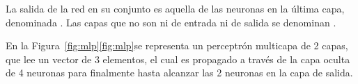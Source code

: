 
La salida de la red en su conjunto es aquella de las neuronas en la
última capa, denominada . Las capas que no son ni de
entrada ni de salida se denominan .

En la \iflatexml{}Figura~\ref{fig:mlp}\else\autoref{fig:mlp}\fi se
representa un perceptrón multicapa de 2 capas, que lee un vector de 3
elementos, el cual es propagado a través de la capa oculta de 4
neuronas para finalmente hasta alcanzar las 2 neuronas en la capa de
salida.
